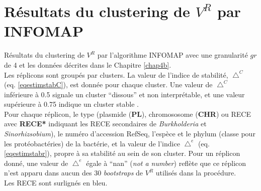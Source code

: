 
\chapter{Résultats du clustering de $V^{R}$ par INFOMAP} %

\label{AppendixD} %

Résultats du clustering de $V^{R}$ par l'algorithme INFOMAP avec une granularité $gr$ de 4 et les données décrites dans le Chapitre \ref{chap4b}. \\
Les réplicons sont groupés par clusters. La valeur de l'indice de stabilité, $\bigtriangleup^{C}$ (eq. \ref{eqestimstabC}), est donnée pour chaque cluster. Une valeur de $\bigtriangleup^{C}$ inférieure à 0.5  signale un cluster “dissous” et non interprétable, et une valeur supérieure à 0.75 indique un cluster stable \citep{hennig2007cluster,Hennig2008}. \\
Pour chaque réplicon, le type (plasmide (\textbf{PL}), chromososome (\textbf{CHR}) ou RECE avec \textbf{RECE*} indiquant les RECE secondaires de \textit{Burkholderia} et \textit{Sinorhizsobium}), le numéro d'accession RefSeq, l'espèce et le phylum (classe pour les protéobactéries) de la bactérie, et la valeur de l'indice $\bigtriangleup^{e}$ (eq. \ref{eqestimstabr}), propre à sa stabilité au sein de son cluster. Pour un réplicon donné, une valeur de $\bigtriangleup^{e}$ égale à “nan” (\textit{not a number}) reflète que ce réplicon n'est apparu dans aucun des 30 \textit{bootstraps} de $V^{R}$ utilisés dans la procédure. \\
Les RECE sont surlignés en bleu.\\

